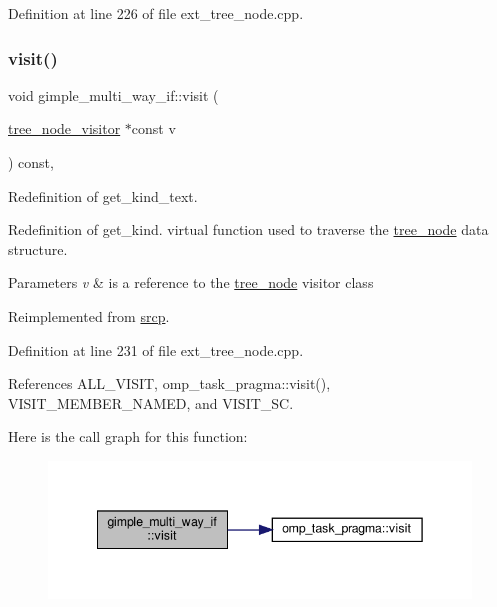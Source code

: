 Definition at line 226 of file ext\+\_\+tree\+\_\+node.\+cpp.

\mbox{\label{structgimple__multi__way__if_a5f89fbe2e85d7d49eb8684204e309712}} 
\subsubsection{\texorpdfstring{visit()}{visit()}}
{\footnotesize\ttfamily void gimple\+\_\+multi\+\_\+way\+\_\+if\+::visit (\begin{DoxyParamCaption}\item[{\hyperlink{classtree__node__visitor}{tree\+\_\+node\+\_\+visitor} $\ast$const}]{v }\end{DoxyParamCaption}) const\hspace{0.3cm}{\ttfamily [override]}, {\ttfamily [virtual]}}



Redefinition of get\+\_\+kind\+\_\+text. 

Redefinition of get\+\_\+kind. virtual function used to traverse the \hyperlink{classtree__node}{tree\+\_\+node} data structure. 
\begin{DoxyParams}{Parameters}
{\em v} & is a reference to the \hyperlink{classtree__node}{tree\+\_\+node} visitor class \\
\hline
\end{DoxyParams}


Reimplemented from \hyperlink{structsrcp_a1cd5943380f069e6ed0a33566af2566d}{srcp}.



Definition at line 231 of file ext\+\_\+tree\+\_\+node.\+cpp.



References A\+L\+L\+\_\+\+V\+I\+S\+IT, omp\+\_\+task\+\_\+pragma\+::visit(), V\+I\+S\+I\+T\+\_\+\+M\+E\+M\+B\+E\+R\+\_\+\+N\+A\+M\+ED, and V\+I\+S\+I\+T\+\_\+\+SC.

Here is the call graph for this function\+:
\nopagebreak
\begin{figure}[H]
\begin{center}
\leavevmode
\includegraphics[width=342pt]{dd/d6c/structgimple__multi__way__if_a5f89fbe2e85d7d49eb8684204e309712_cgraph}
\end{center}
\end{figure}


